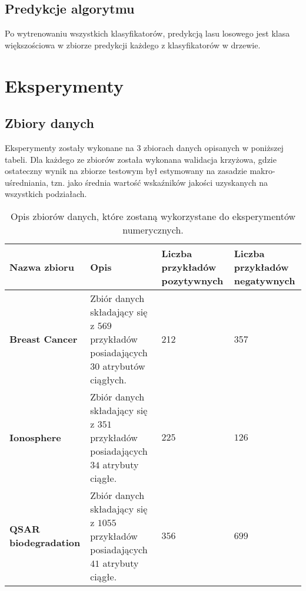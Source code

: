 \documentclass[
    left=2.5cm,         %
    right=2.5cm,        %
    top=2.5cm,          %
    bottom=3cm,         %
    bindingoffset=6mm,  %
    nohyphenation=false %
]{eiti/eiti-report}
\begin{document}
\subsection{Predykcje algorytmu}
Po wytrenowaniu wszystkich klasyfikatorów, predykcją lasu losowego jest klasa większościowa w zbiorze predykcji każdego z klasyfikatorów w drzewie.

\newpage
\section{Eksperymenty}
\subsection{Zbiory danych}
Eksperymenty zostały wykonane na 3 zbiorach danych opisanych w poniższej tabeli. Dla każdego ze zbiorów została wykonana walidacja krzyżowa, gdzie ostateczny wynik na zbiorze testowym był estymowany na zasadzie makro-uśredniania, tzn. jako średnia wartość wskaźników jakości uzyskanych na wszystkich podziałach.

\begin{table}[h]
\centering
\begin{tabular}{ |p{3cm}||p{6cm}|p{2cm}|p{2cm}|  }
    \hline
    \normalsize{Nazwa zbioru}& \normalsize{Opis} & \footnotesize{Liczba przykładów pozytywnych} & \footnotesize{Liczba przykładów negatywnych}\\
    \hline
     \textbf{Breast Cancer} \cite{datasetbreast} & Zbiór danych składający się z $569$ przykładów posiadających $30$ atrybutów ciągłych. & 212 & 357 \\
    \hline
     \textbf{Ionosphere}  \cite{datasetionosphere} & Zbiór danych składający się z $351$ przykładów posiadających $34$ atrybuty ciągłe. & $225$ & $126$\\
    \hline
     \textbf{QSAR biodegradation} \cite{datasetqsar} & Zbiór danych składający się z $1055$ przykładów posiadających $41$ atrybuty ciągłe. & $356$ &  $699$\\
    \hline
\end{tabular}
\caption{Opis zbiorów danych, które zostaną wykorzystane do eksperymentów numerycznych.}
\label{tab:my_label}
\end{table}
\end{document}
